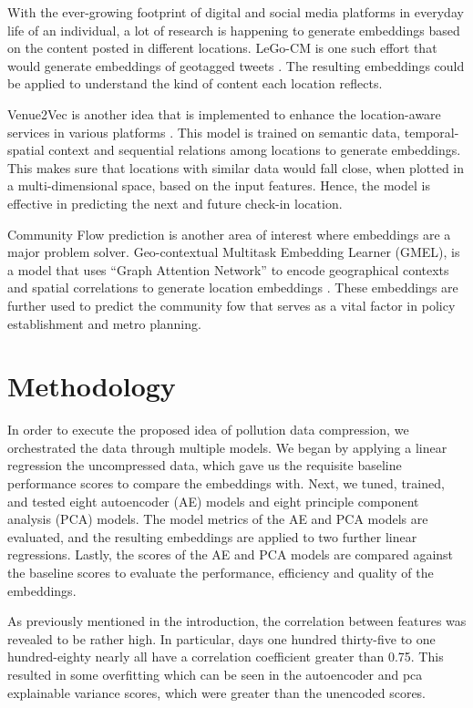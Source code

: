 \documentclass{article}
\begin{document}
\par With the ever-growing footprint of digital and social media platforms in everyday life of an individual, a lot of research is happening to generate embeddings based on the content posted in different locations. LeGo-CM is one such effort that would generate embeddings of geotagged tweets \parencite{GeotaggedTweets}. The resulting embeddings could be applied to understand the kind of content each location reflects.
\par Venue2Vec is another idea that is implemented to enhance the location-aware services in various platforms \parencite{Venue2Vec}. This model is trained on semantic data, temporal-spatial context and sequential relations among locations to generate embeddings. This makes sure that locations with similar data would fall close, when plotted in a multi-dimensional space, based on the input features. Hence, the model is effective in predicting the next and future check-in location. 
\par Community Flow prediction is another area of interest where embeddings are a major problem solver. Geo-contextual Multitask Embedding Learner (GMEL), is a model that uses “Graph Attention Network” to encode geographical contexts and spatial correlations to generate location embeddings \parencite{CommutingFlowPrediction}. These embeddings are further used to predict the community fow that serves as a vital factor in policy establishment and metro planning.

\section{Methodology}

\par In order to execute the proposed idea of pollution data compression, we orchestrated the data through multiple models. We began by applying a linear regression the uncompressed data, which gave us the requisite baseline performance scores to compare the embeddings with. Next, we tuned, trained, and tested eight autoencoder (AE) models and eight principle component analysis (PCA) models. The model metrics of the AE and PCA models are evaluated, and the resulting embeddings are applied to two further linear regressions. Lastly, the scores of the AE and PCA models are compared against the baseline scores to evaluate the performance, efficiency and quality of the embeddings.

\par As previously mentioned in the introduction, the correlation between features was revealed to be rather high. In particular, days one hundred thirty-five to one hundred-eighty nearly all have a correlation coefficient greater than 0.75. This resulted in some overfitting which can be seen in the autoencoder and pca explainable variance scores, which were greater than the unencoded scores.
\end{document}
